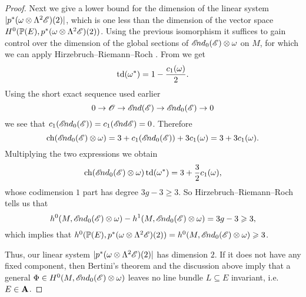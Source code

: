 \documentclass[A4paper, 12pt, british, reqno]{amsart}
\newcommand{\ot}{\otimes}
\newcommand{\dual}{^{*}}
\begin{document}
\begin{prop}
\begin{proof}
	Next we give a lower bound for the dimension of the linear system $|p^{*}(\w\ot\Lambda^{2}\E)(2)|$, which is one less than the dimension of the vector space $H^{0}(\P(E),p^{*}(\w\ot\Lambda^{2}\E)(2))$.
	Using the previous isomorphism it suffices to gain control over the dimension of the global sections of $\sEnd_{0}(\E)\ot \w$ on $M$, for which we can apply Hirzebruch--Riemann--Roch \cite[Theorem A.4.1]{har77}.
	From \cite[Example A.4.1.1]{har77} we get
	\[ \operatorname{td}(\w\dual)=1-\frac{c_{1}(\w)}{2}. \]
	Using the short exact sequence used earlier
	\[ 0\to \mathscr{O}\to \mathscr{E}\negthinspace nd(\mathscr{E}) \to \mathscr{E}\negthinspace nd_{0}(\mathscr{E})\to 0 \]
	we see that $c_{1}(\mathscr{E}\negthinspace nd_{0}(\mathscr{E}))=c_{1}(\mathscr{E}\negthinspace nd{\mathscr{E}})=0$.
	Therefore
	\[ \operatorname{ch}(\sEnd_{0}(\E)\ot \w)=3+c_{1}(\sEnd_{0}(\E))+3c_{1}(\w)=3+3c_{1}(\w). \]
	Multiplying the two expressions we obtain
	\[ \operatorname{ch}(\sEnd_{0}(\E)\ot \w)\operatorname{td}(\w\dual)=3+\frac{3}{2}c_{1}(\w), \]
	whose codimension $1$ part has degree $3g-3\geqslant 3$.
	So Hirzebruch--Riemann--Roch tells us that
	\[ h^{0}(M,\sEnd_{0}(\E)\ot \w)-h^{1}(M,\sEnd_{0}(\E)\ot \w)=3g-3\geqslant 3, \]
	which implies that $h^{0}(\P(E),p^{*}(\w\ot \Lambda^{2}\E)(2))=h^{0}(M,\sEnd_{0}(\E)\ot \w)\geqslant 3$.

	Thus, our linear system $|p^{*}(\w\ot \Lambda^{2}\E)(2)|$ has dimension $2$.
	If it does not have any fixed component, then Bertini's theorem \cite[Theorem 7.19]{iit82} and the discussion above imply that a general $\Phi\in H^{0}(M,\sEnd_{0}(\E)\ot \w)$ leaves no line bundle $L\subseteq E$ invariant, i.e.~$E\in \mathbf{A}$.


\end{proof}
\end{prop}
\end{document}

